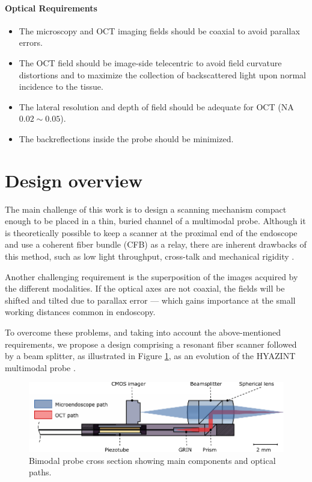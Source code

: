 \paragraph{Optical Requirements}

\begin{itemize}
\item The microscopy and OCT imaging fields should be coaxial to avoid parallax errors. 
\item The OCT field should be image-side telecentric to avoid field curvature distortions and to maximize the collection of backscattered light upon normal incidence to the tissue.
\item The lateral resolution and depth of field should be adequate for OCT (NA $0.02 \sim 0.05$).
\item The backreflections inside the probe should be minimized.
\end{itemize}

  

\section{Design overview}

The main challenge of this work is to design a scanning mechanism compact enough to be placed in a thin, buried channel of a multimodal probe. 
Although it is theoretically possible to keep a scanner at the proximal end of the endoscope and use a coherent fiber bundle (CFB) as a relay, there are inherent drawbacks of this method, such as low light throughput, cross-talk and mechanical rigidity \cite{Ford2009}. 

Another challenging requirement is the superposition of the images acquired by the different modalities. If the optical axes are not coaxial, the fields will be shifted and tilted due to parallax error --- which gains importance at the small working distances common in endoscopy.

To overcome these problems, and taking into account the above-mentioned requirements, we propose a design comprising a resonant fiber scanner followed by a beam splitter, as illustrated in Figure \ref{fig:bimodalSketch}, as an evolution of the HYAZINT multimodal probe \cite{Kretschmer}.

\begin{figure}[h!]\centering
      \includegraphics{figures/10_Introduction/bimodalSketch/out.pdf}
      \caption{Bimodal probe cross section showing main components and optical paths.}
      \label{fig:bimodalSketch}
\end{figure}

